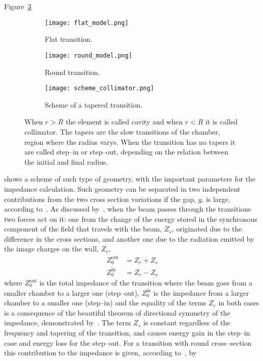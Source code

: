     Figure~\ref{fig:collimator_geometry}
    \begin{figure}[t]
        \centering
        \begin{subfigure}[b]{0.24\textwidth}
            \centering
            \texttt{[image: flat\_model.png]}
            \caption{Flat transition.}
            \label{fig:flat_transition}
        \end{subfigure}
        \begin{subfigure}[b]{0.24\textwidth}
            \centering
            \texttt{[image: round\_model.png]}
            \caption{Round transition.}
            \label{fig:round_transition}
        \end{subfigure}
        \begin{subfigure}[b]{0.5\textwidth}
            \centering
            \texttt{[image: scheme\_collimator.png]}
            \caption{Scheme of a tapered transition.}
            \label{fig:collimator_geometry}
        \end{subfigure}
        \caption[Scheme of a tapered transition.]{When $r>R$ the element is called cavity and when $r<R$ it is called collimator. The tapers are the slow transitions of the chamber, region where the radius varys. When the transition has no tapers it are called step--in or step--out, depending on the relation between the initial and final radius.}
        \label{fig:collimator_geometry_types}
    \end{figure}
    shows a scheme of such type of geometry, with the important parameters for the impedance calculation. Such geometry can be separated in two independent contributions from the two cross section variations if the gap, $g$, is large, according to~. As discussed by~, when the beam passes through the transitions two forces act on it: one from the change of the energy stored in the synchronous component of the field that travels with the beam, $Z_s$, originated due to the difference in the cross sections, and another one due to the radiation emitted by the image charges on the wall, $Z_r$,
    \begin{subequations}
        \begin{align}
            Z_0^\text{out} &= Z_r + Z_s\\
            Z_0^\text{in}  &= Z_r - Z_s
        \end{align}
    \end{subequations}
    where $Z_0^\text{out}$ is the total impedance of the transition where the beam goes from a smaller chamber to a larger one (step--out), $Z_0^\text{in}$ is the impedance from a larger chamber to a smaller one (step--in) and the equality of the terms $Z_r$ in both cases is a consequence of the beautiful theorem of directional symmetry of the impedance, demonstrated by~. The term $Z_s$ is constant regardless of the frequency and tapering of the transition, and causes energy gain in the step--in case and energy loss for the step--out. For a transition with round cross--section this contribution to the impedance is given, according to~, by
